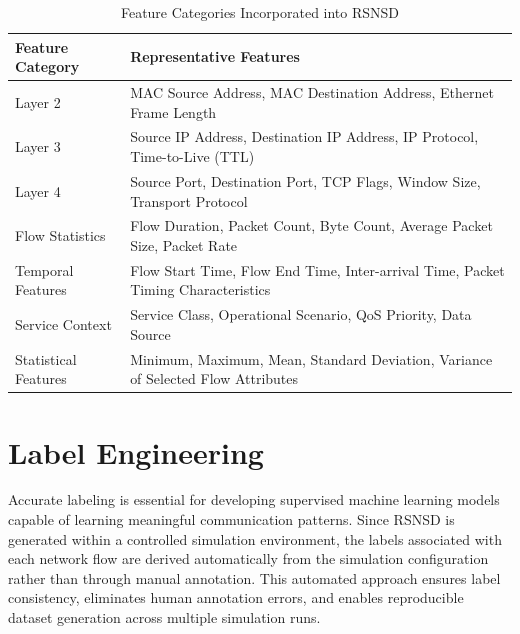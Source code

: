 \documentclass[12pt,a4paper]{report}
\begin{document}
	\begin{table}[H]
		\centering
		\caption{Feature Categories Incorporated into RSNSD}
		\label{tab:feature_categories}
		
		\begin{tabular}{|p{5cm}|p{9cm}|}
			\hline
			
			\textbf{Feature Category} &
			\textbf{Representative Features}
			\\
			\hline
			
			Layer 2 &
			MAC Source Address, MAC Destination Address, Ethernet Frame Length
			\\
			\hline
			
			Layer 3 &
			Source IP Address, Destination IP Address, IP Protocol, Time-to-Live (TTL)
			\\
			\hline
			
			Layer 4 &
			Source Port, Destination Port, TCP Flags, Window Size, Transport Protocol
			\\
			\hline
			
			Flow Statistics &
			Flow Duration, Packet Count, Byte Count, Average Packet Size, Packet Rate
			\\
			\hline
			
			Temporal Features &
			Flow Start Time, Flow End Time, Inter-arrival Time, Packet Timing Characteristics
			\\
			\hline
			
			Service Context &
			Service Class, Operational Scenario, QoS Priority, Data Source
			\\
			\hline
			
			Statistical Features &
			Minimum, Maximum, Mean, Standard Deviation, Variance of Selected Flow Attributes
			\\
			\hline
			
		\end{tabular}
		
	\end{table}
	\section{Label Engineering}
	\label{sec:label_engineering}
	
	Accurate labeling is essential for developing supervised machine learning models capable of learning meaningful communication patterns. Since RSNSD is generated within a controlled simulation environment, the labels associated with each network flow are derived automatically from the simulation configuration rather than through manual annotation. This automated approach ensures label consistency, eliminates human annotation errors, and enables reproducible dataset generation across multiple simulation runs.
	
\end{document}
